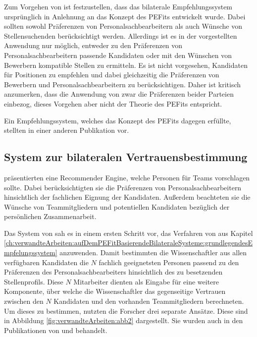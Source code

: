 Zum Vorgehen von \textcite[S. 3ff.]{malinowski:2006} ist festzustellen, dass das bilaterale Empfehlungssystem ursprünglich in Anlehnung an das Konzept des \acp{PEFit} entwickelt wurde. Dabei sollten sowohl Präferenzen von Personalsachbearbeitern als auch Wünsche von Stellensuchenden berücksichtigt werden. Allerdings ist es in der vorgestellten Anwendung nur möglich, entweder zu den Präferenzen von Personalsachbearbeitern passende Kandidaten oder mit den Wünschen von Bewerbern kompatible Stellen zu ermitteln. Es ist nicht vorgesehen, Kandidaten für Positionen zu empfehlen und dabei gleichzeitig die Präferenzen von Bewerbern und Personalsachbearbeitern zu berücksichtigen. Daher ist kritisch anzumerken, dass die Anwendung von \textcite[S. 3ff.]{malinowski:2006} zwar die Präferenzen beider Parteien einbezog, dieses Vorgehen aber nicht der Theorie des \acp{PEFit} entspricht.

Ein Empfehlungssystem, welches das Konzept des \acp{PEFit} dagegen erfüllte, stellten \textcite[S. 1ff.]{malinowski:2005} in einer anderen Publikation vor.

\subsection{System zur bilateralen Vertrauensbestimmung}
\label{ch:verwandteArbeiten:aufDemPEFitBasierendeBilateraleSysteme:bilateraleVertrauensbestimmung}
\textcite[S. 1]{malinowski:2005} präsentierten eine Recommender Engine, welche Personen für Teams vorschlagen sollte. Dabei berücksichtigten sie die Präferenzen von Personalsachbearbeitern hinsichtlich der fachlichen Eignung der Kandidaten. Außerdem beachteten sie die Wünsche von Teammitgliedern und potentiellen Kandidaten bezüglich der persönlichen Zusammenarbeit.

Das System von \textcite[S. 4ff.]{malinowski:2005} sah es in einem ersten Schritt vor, das Verfahren von \textcite[S. 8ff.]{faerber:2003} aus Kapitel \ref{ch:verwandteArbeiten:aufDemPEFitBasierendeBilateraleSysteme:grundlegendesEmpfelungssystem} anzuwenden. Damit bestimmten die Wissenschaftler aus allen verfügbaren Kandidaten die $N$ fachlich geeignetsten Personen passend zu den Präferenzen des Personalsachbearbeiters hinsichtlich des zu besetzenden Stellenprofils. Diese $N$ Mitarbeiter dienten als Eingabe für eine weitere Komponente, über welche die Wissenschaftler das gegenseitige Vertrauen zwischen den $N$ Kandidaten und den vorhanden Teammitgliedern berechneten. Um dieses zu bestimmen, nutzten die Forscher drei separate Ansätze. Diese sind in Abbildung \ref{fig:verwandteArbeiten:abb2} dargestellt. Sie wurden auch in den Publikationen von \textcite[S. 5ff.]{keim:2005} und \textcite[S. 6ff.]{malinowski:2008} behandelt.

